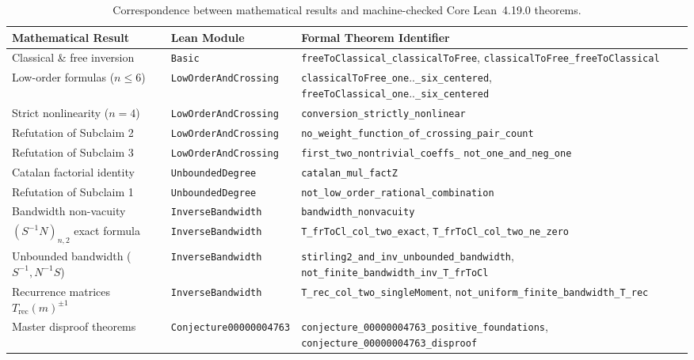 \documentclass[11pt,a4paper]{article}
\renewcommand{\arraystretch}{1.15}
\theoremstyle{definition}
\theoremstyle{remark}
\begin{document}
\begin{table}[ht]
\centering
\footnotesize
\renewcommand{\arraystretch}{0.92}
\setlength{\tabcolsep}{4pt}
\begin{tabular}{@{}>{\raggedright\arraybackslash}p{4.0cm}l>{\raggedright\arraybackslash}p{7.4cm}@{}}
\hline
Mathematical Result & Lean Module & Formal Theorem Identifier \\
\hline
Classical \& free inversion & \texttt{Basic} & \texttt{freeToClassical\_classicalToFree}, \newline \texttt{classicalToFree\_freeToClassical} \\
Low-order formulas ($n \le 6$) & \texttt{LowOrderAndCrossing} & \texttt{classicalToFree\_one}..\texttt{\_six\_centered}, \newline \texttt{freeToClassical\_one}..\texttt{\_six\_centered} \\
Strict nonlinearity ($n = 4$) & \texttt{LowOrderAndCrossing} & \texttt{conversion\_strictly\_nonlinear} \\
Refutation of Subclaim 2 & \texttt{LowOrderAndCrossing} & \texttt{no\_weight\_function\_of\_crossing\_pair\_count} \\
Refutation of Subclaim 3 & \texttt{LowOrderAndCrossing} & \texttt{first\_two\_nontrivial\_coeffs\_} \newline \texttt{not\_one\_and\_neg\_one} \\
Catalan factorial identity & \texttt{UnboundedDegree} & \texttt{catalan\_mul\_factZ} \\
Refutation of Subclaim 1 & \texttt{UnboundedDegree} & \texttt{not\_low\_order\_rational\_combination} \\
Bandwidth non-vacuity & \texttt{InverseBandwidth} & \texttt{bandwidth\_nonvacuity} \\
$(S^{-1}N)_{n,2}$ exact formula & \texttt{InverseBandwidth} & \texttt{T\_frToCl\_col\_two\_exact}, \newline \texttt{T\_frToCl\_col\_two\_ne\_zero} \\
Unbounded bandwidth ($S^{-1}, N^{-1}S$) & \texttt{InverseBandwidth} & \texttt{stirling2\_and\_inv\_unbounded\_bandwidth}, \newline \texttt{not\_finite\_bandwidth\_inv\_T\_frToCl} \\
Recurrence matrices $T_{\mathrm{rec}}(m)^{\pm 1}$ & \texttt{InverseBandwidth} & \texttt{T\_rec\_col\_two\_singleMoment}, \newline \texttt{not\_uniform\_finite\_bandwidth\_T\_rec} \\
Master disproof theorems & \texttt{Conjecture00000004763} & \texttt{conjecture\_00000004763\_positive\_foundations}, \newline \texttt{conjecture\_00000004763\_disproof} \\
\hline
\end{tabular}
\caption{Correspondence between mathematical results and machine-checked Core Lean~4.19.0 theorems.}
\label{tab:lean-map}
\end{table}
\end{document}
